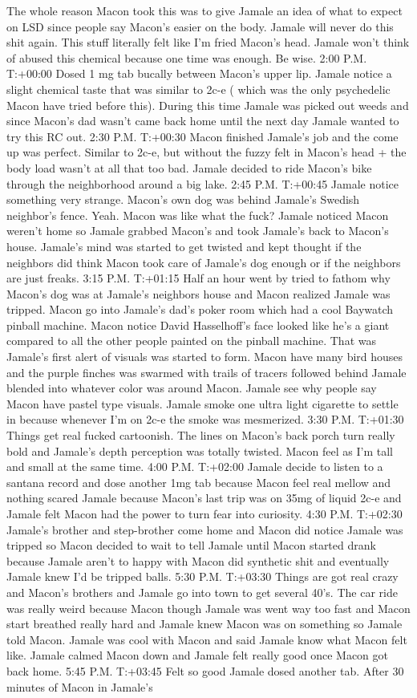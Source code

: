 \documentclass[12pt]{book}
\begin{document}
The whole reason Macon took this was to give Jamale an idea of what to expect on LSD since people say Macon's easier on the body. Jamale will never do this shit again. This stuff literally felt like I'm fried Macon's head. Jamale won't think of abused this chemical because one time was enough. Be wise. 2:00 P.M. T:+00:00 Dosed 1 mg tab bucally between Macon's upper lip. Jamale notice a slight chemical taste that was similar to 2c-e ( which was the only psychedelic Macon have tried before this). During this time Jamale was picked out weeds and since Macon's dad wasn't came back home until the next day Jamale wanted to try this RC out. 2:30 P.M. T:+00:30 Macon finished Jamale's job and the come up was perfect. Similar to 2c-e, but without the fuzzy felt in Macon's head + the body load wasn't at all that too bad. Jamale decided to ride Macon's bike through the neighborhood around a big lake. 2:45 P.M. T:+00:45 Jamale notice something very strange. Macon's own dog was behind Jamale's Swedish neighbor's fence. Yeah. Macon was like what the fuck? Jamale noticed Macon weren't home so Jamale grabbed Macon's and took Jamale's back to Macon's house. Jamale's mind was started to get twisted and kept thought if the neighbors did think Macon took care of Jamale's dog enough or if the neighbors are just freaks. 3:15 P.M. T:+01:15 Half an hour went by tried to fathom why Macon's dog was at Jamale's neighbors house and Macon realized Jamale was tripped. Macon go into Jamale's dad's poker room which had a cool Baywatch pinball machine. Macon notice David Hasselhoff's face looked like he's a giant compared to all the other people painted on the pinball machine. That was Jamale's first alert of visuals was started to form. Macon have many bird houses and the purple finches was swarmed with trails of tracers followed behind Jamale blended into whatever color was around Macon. Jamale see why people say Macon have pastel type visuals. Jamale smoke one ultra light cigarette to settle in because whenever I'm on 2c-e the smoke was mesmerized. 3:30 P.M. T:+01:30 Things get real fucked cartoonish. The lines on Macon's back porch turn really bold and Jamale's depth perception was totally twisted. Macon feel as I'm tall and small at the same time. 4:00 P.M. T:+02:00 Jamale decide to listen to a santana record and dose another 1mg tab because Macon feel real mellow and nothing scared Jamale because Macon's last trip was on 35mg of liquid 2c-e and Jamale felt Macon had the power to turn fear into curiosity. 4:30 P.M. T:+02:30 Jamale's brother and step-brother come home and Macon did notice Jamale was tripped so Macon decided to wait to tell Jamale until Macon started drank because Jamale aren't to happy with Macon did synthetic shit and eventually Jamale knew I'd be tripped balls. 5:30 P.M. T:+03:30 Things are got real crazy and Macon's brothers and Jamale go into town to get several 40's. The car ride was really weird because Macon though Jamale was went way too fast and Macon start breathed really hard and Jamale knew Macon was on something so Jamale told Macon. Jamale was cool with Macon and said Jamale know what Macon felt like. Jamale calmed Macon down and Jamale felt really good once Macon got back home. 5:45 P.M. T:+03:45 Felt so good Jamale dosed another tab. After 30 minutes of Macon in Jamale's 
\end{document}
